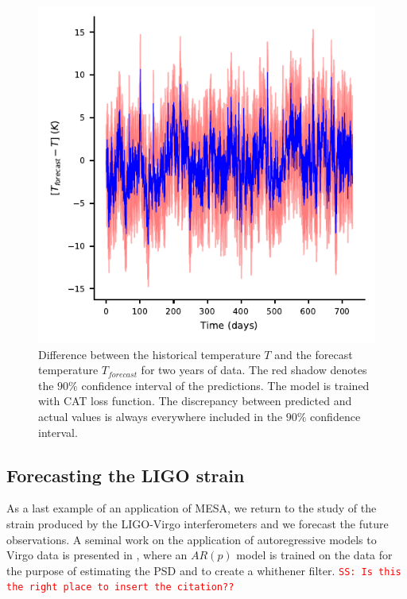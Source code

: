 \documentclass[twocolumn,showpacs,preprintnumbers,nofootinbib,prd,
superscriptaddress,10pt]{revtex4-1}
\newcommand{\sschmidt}[1]{{\textcolor{red}{\texttt{SS: #1}} }}
\begin{document}
\begin{figure}
	\caption{Difference between the historical temperature $T$ and the forecast temperature $T_{forecast}$ for two years of data. The red shadow denotes the $90\%$ confidence interval of the predictions. The model is trained with CAT loss function. The discrepancy between predicted and actual values is always everywhere included in the $90\%$ confidence interval.}
	\label{fig:temp_forecast}
	\includegraphics{Images/climate_plots/forecast_accuracy.pdf}
\end{figure}

\subsection{Forecasting the LIGO strain} \label{sec:LIGO_forecasting}
As a last example of an application of MESA, we return to the study of the strain produced by the LIGO-Virgo interferometers 
and we forecast the future observations.
A seminal work on the application of autoregressive models to Virgo data is presented in \cite{Cuoco_2001}, where an $AR(p)$ model is trained on the data for the purpose of estimating the PSD and to create a whithener filter. \sschmidt{Is this the right place to insert the citation??}
\end{document}
